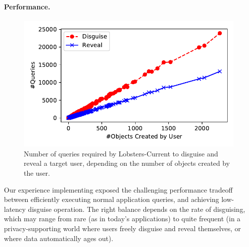 
\paragraph{Performance.}
\label{sec:perf}

\begin{figure}[t!]
    \centerline{\includegraphics[width=.5\textwidth]{img/perf}}
    \caption{Number of queries required by Lobsters-Current to disguise and reveal a target user, depending on the number of
    objects created by the user.}
    \label{fig:latencies}
    \vspace{-\baselineskip}
\end{figure}

Our experience implementing \sys exposed the challenging performance tradeoff between efficiently
executing normal application queries, and achieving low-latency disguise operation. The right
balance depends on the rate of disguising, which may range from rare (as in today's applications)
to quite frequent (in a privacy-supporting world where users freely disguise and reveal themselves,
or where data automatically ages out).

